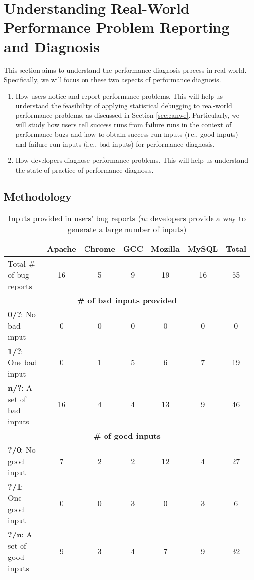 \section{Understanding Real-World Performance Problem Reporting and Diagnosis}
\label{sec:study}

This section aims to understand the performance diagnosis process
in real world. Specifically, we will focus on these two aspects of
performance diagnosis.

\begin{enumerate}
\item How users notice and report performance problems.
This will help us understand the feasibility of applying statistical debugging
to real-world performance problems, as discussed in 
Section \ref{sec:canwe}. Particularly, we will study how users
tell success runs from failure
runs in the context of performance bugs and how to obtain
success-run inputs (i.e., good inputs) and failure-run inputs
(i.e., bad inputs) for performance diagnosis.
\item How developers diagnose performance problems.
This will help us understand the state of practice of performance diagnosis.
\end{enumerate}

\subsection{Methodology}



\begin{table*}[tb!]
\begin{adjustwidth}{-.5in}{-.5in}
\small
\centering
{
\begin{tabular}{|lcccccc|}
\hline
&Apache&Chrome&GCC&Mozilla&MySQL&Total\\
\hline
Total \# of bug reports & 16 & 5 & 9 & 19 & 16 & 65 \\
\hline
\multicolumn{7}{|c|}{\bf \# of bad inputs provided}\\
\multicolumn{1}{|l}{{\bf 0/?}: No bad input }
&0&0&0&0&0&0\\
\multicolumn{1}{|l}{{\bf 1/?}: One bad input}
&0&1&5&6&7&19\\
\multicolumn{1}{|l}{{\bf n/?}: A set of bad inputs}
&16&4&4&13&9&46\\
\hline
\multicolumn{7}{|c|}{\bf \# of good inputs}\\
\multicolumn{1}{|l}{{\bf ?/0}: No good input}
&7&2&2&12&4&27\\
\multicolumn{1}{|l}{{\bf ?/1}: One good input}
&0&0&3&0&3&6\\
\multicolumn{1}{|l}{{\bf ?/n}: A set of good inputs}
&9&3&4&7&9&32\\
\hline
\end{tabular}
}
\end{adjustwidth}
\caption{Inputs provided in users' bug reports ($n$: 
developers provide a way to generate a large number of inputs)}
\label{tab:input}
\end{table*}



